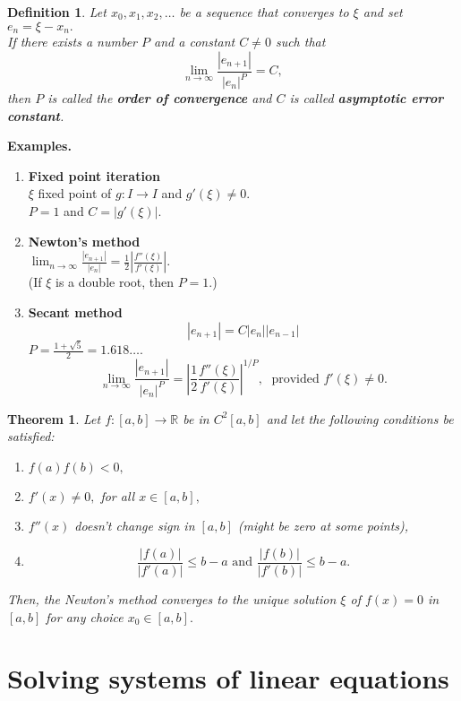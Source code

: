 \documentclass{article}
\newtheorem{theorem}{Theorem}
\newtheorem{defn}{Definition}
\begin{document}
\begin{defn} 
	Let $x_0, x_1, x_2, \ldots$ be a sequence that converges to $\xi$ and set $e_n = \xi - x_n.$\\
	If there exists a number $P$ and a constant $C \neq 0$ such that
	\[\lim_{n\to \infty}\frac{|e_{n+1}|}{|e_n|^P} = C,\]
	then $P$ is called the \textbf{order of convergence} and $C$ is called \textbf{asymptotic error constant}.
\end{defn}

\textbf{Examples.}
\begin{enumerate} 
	\item \textbf{Fixed point iteration}\\
	$\xi$ fixed point of $g:I\to I$ and $g'(\xi) \neq 0.$\\
	$P = 1$ and $C = |g'(\xi)|.$
	\item \textbf{Newton's method}\\
	$\displaystyle\lim_{n\to \infty}\frac{|e_{n+1}|}{|e_n|} = \frac{1}{2}\left|\frac{f''(\xi)}{f'(\xi)}\right|.$\\
	(If $\xi$ is a double root, then $P = 1.$)
	\item \textbf{Secant method}
	\[|e_{n+1}| = C|e_n||e_{n-1}|\]
	$P = \frac{1 + \sqrt{5}}{2} = 1.618\ldots.$\\
	\[\lim_{n\to \infty}\frac{|e_{n+1}|}{|e_n|^P} = \left|\frac{1}{2}\frac{f''(\xi)}{f'(\xi)}\right|^{1/P},\;\text{ provided }f'(\xi) \neq 0.\]
\end{enumerate}

\begin{theorem} 
	Let $f:[a, b] \to \mathbb{R}$ be in $C^2[a, b]$ and let the following conditions be satisfied:
	\begin{enumerate}[nosep] 
		\item $f(a)f(b) < 0,$
		\item $f'(x) \neq 0,$ for all $x \in [a, b],$
		\item $f''(x)$ doesn't change sign in $[a, b]$ (might be zero at some points),
		\item 
		\[\frac{|f(a)|}{|f'(a)|} \le b - a \text{ and }\frac{|f(b)|}{|f'(b)|} \le b - a.\]
	\end{enumerate}
	Then, the Newton's method converges to the unique solution $\xi$ of $f(x) = 0$ in $[a, b]$ for any choice $x_0 \in [a, b].$
\end{theorem}

\section{Solving systems of linear equations}
\end{document}

